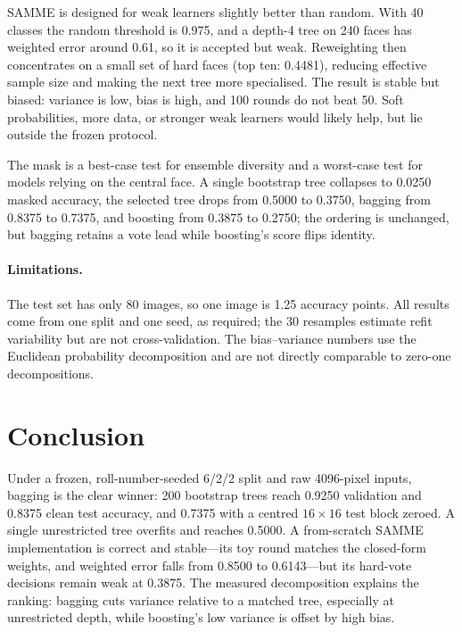 \documentclass[10pt,twocolumn,letterpaper]{article}
\begin{document}
SAMME is designed for weak learners slightly better than random.  With 40
classes the random threshold is 0.975, and a depth-4 tree on 240 faces has
weighted error around 0.61, so it is accepted but weak.  Reweighting then
concentrates on a small set of hard faces (top ten: 0.4481), reducing effective
sample size and making the next tree more specialised.  The result is stable but
biased: variance is low, bias is high, and 100 rounds do not beat 50.  Soft
probabilities, more data, or stronger weak learners would likely help, but lie
outside the frozen protocol.

The mask is a best-case test for ensemble diversity and a worst-case test for
models relying on the central face.  A single bootstrap tree collapses to 0.0250
masked accuracy, the selected tree drops from 0.5000 to 0.3750, bagging from
0.8375 to 0.7375, and boosting from 0.3875 to 0.2750; the ordering is unchanged,
but bagging retains a vote lead while boosting's score flips identity.

\paragraph{Limitations.}  The test set has only 80 images, so one image is 1.25
accuracy points.  All results come from one split and one seed, as required; the
30 resamples estimate refit variability but are not cross-validation.  The
bias--variance numbers use the Euclidean probability decomposition and are not
directly comparable to zero-one decompositions.

\section{Conclusion}

Under a frozen, roll-number-seeded 6/2/2 split and raw 4096-pixel inputs,
bagging is the clear winner: 200 bootstrap trees reach 0.9250 validation and
0.8375 clean test accuracy, and 0.7375 with a centred $16\times16$ test block
zeroed.  A single unrestricted tree overfits and reaches 0.5000.  A from-scratch
SAMME implementation is correct and stable---its toy round matches the
closed-form weights, and weighted error falls from 0.8500 to 0.6143---but its
hard-vote decisions remain weak at 0.3875.  The measured decomposition explains
the ranking: bagging cuts variance relative to a matched tree, especially at
unrestricted depth, while boosting's low variance is offset by high bias.

{
\small


}
\end{document}
